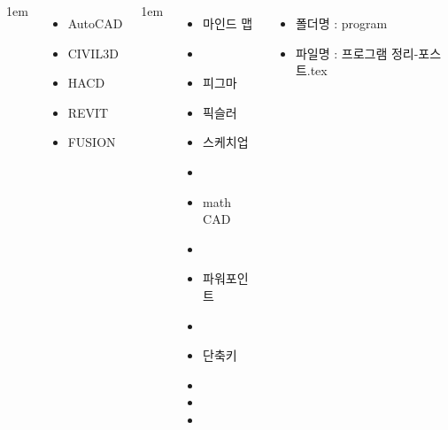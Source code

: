 \documentclass[	17pt, 
							a2paper, 
							landscape,
							margin=0mm, %
							innermargin=10mm,  		%
							blockverticalspace=4mm, %
							colspace=5mm, 
							subcolspace=0mm
							]{tikzposter}
\begin{document}
\begin{columns}
			{
					\setlength{\labelsep} {1em}
					\begin{itemize}
					\item AutoCAD

					\item CIVIL3D

					\item HACD

					\item REVIT

					\item FUSION
					\end{itemize}
			} %




			{
					\setlength{\leftmargini}{3em}
					\setlength{\labelsep} {1em}
					\begin{itemize}
					\item 마인드 맵
					\item 
					\item 피그마
					\item 픽슬러
					\item 스케치업
					\item 
					\item math CAD
					\item 
					\item 파워포인트
					\item 
					\item 단축키
					\item 
					\item 
					\item 
					\end{itemize}
			} %



			{
					\begin{itemize}
					\item 폴더명 : program
					\item 파일명 : 프로그램 정리-포스트.tex
					\end{itemize}
			}



	\end{columns}
\end{document}
